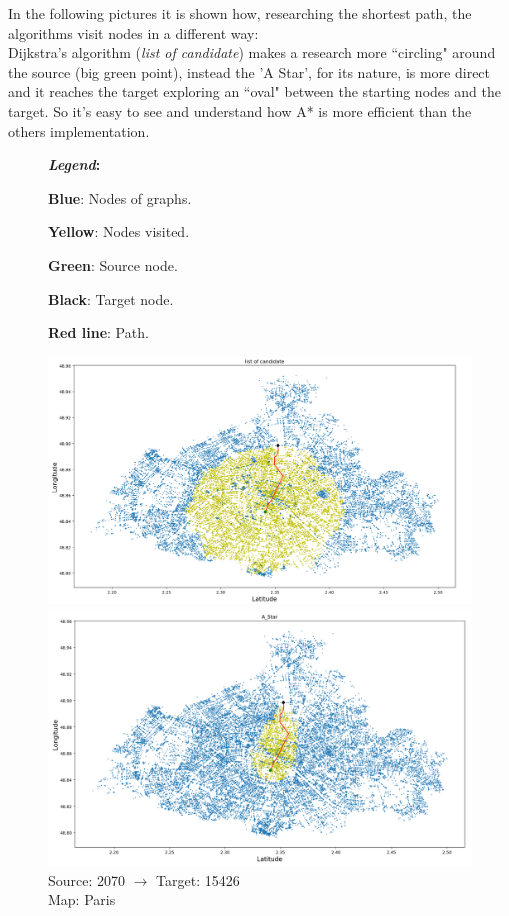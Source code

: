 \documentclass[a4paper,11pt]{report}
\begin{document}
In the following pictures it is shown how, researching the shortest path, the algorithms visit nodes in a different way:\\
Dijkstra's algorithm (\textit{list of candidate}) makes a research more ``circling" around the source (big green point), instead the 'A Star', for its nature, is more direct and it reaches the target exploring an ``oval" between the starting nodes and the target. So it's easy to see and understand how A* is more efficient than the others implementation.\\
  
\begin{figure}[H]
	\textbf{\textit{Legend}:}
	\begin{itemize}
{\small 		\item \textbf{Blue}: Nodes of graphs.
		\item \textbf{Yellow}: Nodes visited.
		\item \textbf{Green}: Source node.
		\item \textbf{Black}: Target node.
		\item \textbf{Red line}: Path.}
	\end{itemize}
	\centering
		\includegraphics[width=\textwidth]{img/mapOutput/2070-15426LoC.png}
		\label{fig:ListOfCandidate1}
		\includegraphics[width=\textwidth]{img/mapOutput/2070-15426A_Star.png}
		\label{fig:A_Start1}
	Source: 2070 $\to$ Target: 15426\\Map: Paris
\end{figure}
\end{document}
